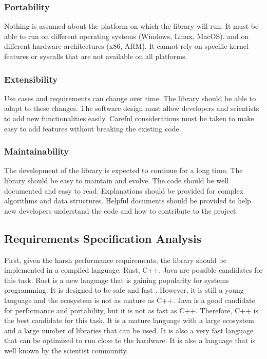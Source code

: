 \begin{spacing}{1.2}
    \subsubsection{Portability}
    Nothing is assumed about the platform on which the library will run. It must be able to run on different operating systems (Windows, Linux, MacOS).
    and on different hardware architectures (x86, ARM). It cannot rely on specific kernel features or syscalls that are not available on all platforms.


    \subsubsection{Extensibility}
    Use cases and requirements can change over time. The library should be able to adapt to these changes.
    The software design must allow developers and scientists to add new functionalities easily.
    Careful considerations must be taken to make easy to add features without breaking the existing code.


    \subsubsection{Maintainability}
    The development of the library is expected to continue for a long time. The library should be easy to maintain and evolve.
    The code should be well documented and easy to read. Explanations should be provided for complex algorithms and data structures.
    Helpful documents should be provided to help new developers understand the code and how to contribute to the project.

    \subsection{Requirements Specification Analysis}
    First, given the harsh performance requirements, the library should be implemented in a compiled language.
    Rust, C++, Java are possible candidates for this task. Rust is a new language that is gaining popularity for systems programming.
    It is designed to be safe and fast \cite{bugden2022rust}. However, it is still a young language and the ecosystem is not as mature as C++.
    Java is a good candidate for performance and portability, but it is not as fast as C++.
    Therefore, C++ is the best candidate for this task. It is a mature language with a large ecosystem and a large number of libraries that can be used.
    It is also a very fast language that can be optimized to run close to the hardware. It is also a language that is well known by the scientist community.\\


\end{spacing}
